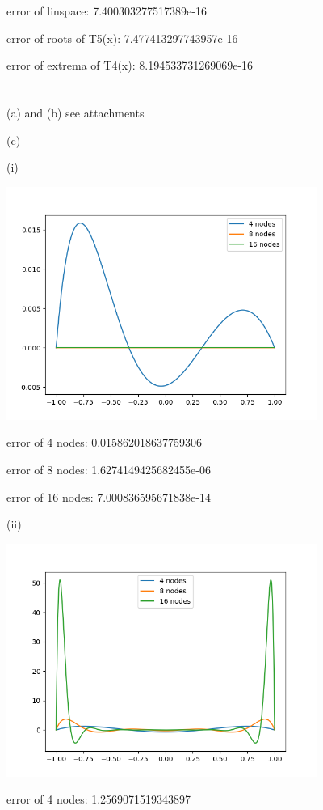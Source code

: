 \documentclass[10pt]{article}
\begin{document}
error of linspace: 7.400303277517389e-16

error of roots of T5(x): 7.477413297743957e-16

error of extrema of T4(x): 8.194533731269069e-16

\section{}

(a) and (b) see attachments

(c)

(i)

\includegraphics[width=4in]{p2ci.png}

error of 4 nodes: 0.015862018637759306

error of 8 nodes: 1.6274149425682455e-06

error of 16 nodes: 7.000836595671838e-14


(ii)

\includegraphics[width=4in]{p2cii.png}

error of 4 nodes: 1.2569071519343897
\end{document}
